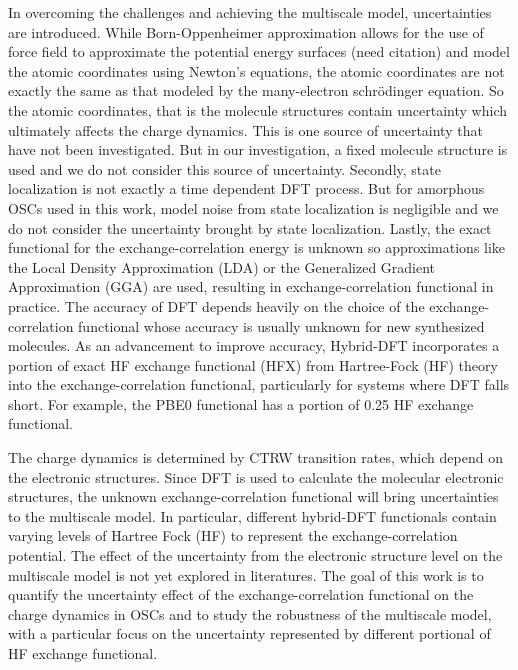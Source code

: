 \documentclass[letterpaper,12pt]{article}
\begin{document}
In overcoming the challenges and achieving the multiscale model, uncertainties are introduced. 
While Born-Oppenheimer approximation allows for the use of force field to approximate the potential energy surfaces (need citation) and model the atomic coordinates using Newton’s equations, the atomic coordinates are not exactly the same as that modeled by the many-electron schr\"{o}dinger equation.
So the atomic coordinates, that is the molecule structures contain uncertainty which ultimately affects the charge dynamics. 
This is one source of uncertainty that have not been investigated.
But in our investigation, a fixed molecule structure is used and we do not consider this source of uncertainty. 
Secondly, state localization is not exactly a time dependent DFT process. 
But for amorphous OSCs used in this work, model noise from state localization is negligible and we do not consider the uncertainty brought by state localization.
Lastly, the exact functional for the exchange-correlation energy is unknown so approximations like the Local Density Approximation (LDA) or the Generalized Gradient Approximation (GGA) are used, resulting in exchange-correlation functional in practice. 
The accuracy of DFT depends heavily on the choice of the exchange-correlation functional whose accuracy is usually unknown for new synthesized molecules. 
As an advancement to improve accuracy, Hybrid-DFT incorporates a portion of exact HF exchange functional (HFX) from Hartree-Fock (HF) theory into the exchange-correlation functional, particularly for systems where DFT falls short. For example, the PBE0 functional has a portion of 0.25 HF exchange functional. 

The charge dynamics is determined by CTRW transition rates, which depend on the electronic structures.
Since DFT is used to calculate the molecular electronic structures, the unknown exchange-correlation functional will bring uncertainties to the multiscale model. 
In particular, different hybrid-DFT functionals contain varying levels of Hartree Fock (HF) to represent the exchange-correlation potential. 
The effect of the uncertainty from the electronic structure level on the multiscale model is not yet explored in literatures. 
The goal of this work is to quantify the uncertainty effect of the exchange-correlation functional on the charge dynamics in OSCs and to study the robustness of the multiscale model, with a particular focus on the uncertainty represented by different portional of HF exchange functional. 
\end{document}
